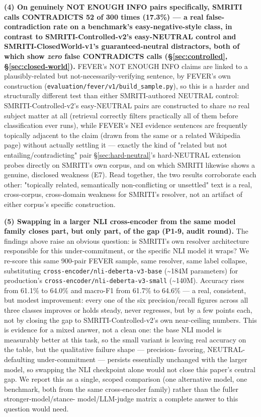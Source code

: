 \textbf{(4) On genuinely NOT ENOUGH INFO pairs specifically, SMRITI
calls CONTRADICTS 52 of 300 times (17.3\%) --- a real false-contradiction
rate on a benchmark's easy-negative-style class, in contrast to
SMRITI-Controlled-v2's easy-NEUTRAL control and
SMRITI-ClosedWorld-v1's guaranteed-neutral distractors, both of which
show \emph{zero} false CONTRADICTS calls (\S\ref{sec:controlled},
\S\ref{sec:closed-world}).} FEVER's NOT ENOUGH INFO claims are linked to
a plausibly-related but not-necessarily-verifying sentence, by FEVER's
own construction (\texttt{evaluation/fever/v1/build\_sample.py}), so this
is a harder and structurally different test than either SMRITI-authored
NEUTRAL control: SMRITI-Controlled-v2's easy-NEUTRAL pairs are
constructed to share \emph{no} real subject matter at all (retrieval
correctly filters practically all of them before classification ever
runs), while FEVER's NEI evidence sentences are frequently
topically adjacent to the claim (drawn from the same or a related
Wikipedia page) without actually settling it --- exactly the kind of
"related but not entailing/contradicting" pair
\S\ref{sec:hard-neutral}'s hard-NEUTRAL extension probes directly on
SMRITI's own corpus, and on which SMRITI likewise shows a genuine,
disclosed weakness (E7). Read together, the two results corroborate each
other: "topically related, semantically non-conflicting or unsettled"
text is a real, cross-corpus, cross-domain weakness for SMRITI's
resolver, not an artifact of either corpus's specific construction.



\textbf{(5) Swapping in a larger NLI cross-encoder from the same model
family closes part, but only part, of the gap (P1-9, audit round).} The
findings above raise an obvious question: is SMRITI's own resolver
architecture responsible for this under-commitment, or the specific NLI
model it wraps? We re-score this same 900-pair FEVER sample, same
resolver, same label collapse, substituting
\texttt{cross-encoder/nli-deberta-v3-base} (\textasciitilde 184M
parameters) for production's \texttt{cross-encoder/nli-deberta-v3-small}
(\textasciitilde 140M). Accuracy rises from 61.1\% to 64.0\% and macro-F1
from 61.7\% to 64.6\% --- a real, consistent, but modest improvement:
every one of the six precision/recall figures across all three classes
improves or holds steady, never regresses, but by a few points each, not
by closing the gap to SMRITI-Controlled-v2's own near-ceiling numbers.
This is evidence for a mixed answer, not a clean one: the base NLI model
is measurably better at this task, so the small variant is leaving real
accuracy on the table, but the qualitative failure shape --- precision-
favoring, NEUTRAL-defaulting under-commitment --- persists essentially
unchanged with the larger model, so swapping the NLI checkpoint alone
would not close this paper's central gap. We report this as a single,
scoped comparison (one alternative model, one benchmark, both from the
same cross-encoder family) rather than the fuller stronger-model/stance-
model/LLM-judge matrix a complete answer to this question would need.

